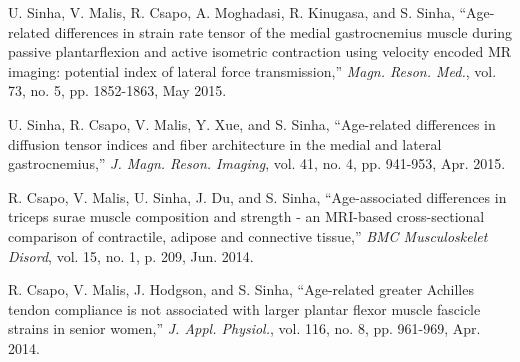\begin{frontmatter}
\begin{vitapage}
\begin{publications}
  \item U. Sinha, V. Malis, R. Csapo, A. Moghadasi, R. Kinugasa, and S. Sinha, ``Age-related differences in strain rate tensor of the medial gastrocnemius muscle during passive plantarflexion and active isometric contraction using velocity encoded MR imaging: potential index of lateral force transmission,'' \emph{Magn. Reson. Med.}, vol. 73, no. 5, pp. 1852-1863, May 2015.
  \item U. Sinha, R. Csapo, V. Malis, Y. Xue, and S. Sinha, ``Age-related differences in diffusion tensor indices and fiber architecture in the medial and lateral gastrocnemius,'' \emph{J. Magn. Reson. Imaging}, vol. 41, no. 4, pp. 941-953, Apr. 2015.
  \item R. Csapo, V. Malis, U. Sinha, J. Du, and S. Sinha, ``Age-associated differences in triceps surae muscle composition and strength - an MRI-based cross-sectional comparison of contractile, adipose and connective tissue,'' \emph{BMC Musculoskelet Disord}, vol. 15, no. 1, p. 209, Jun. 2014.
  \item R. Csapo, V. Malis, J. Hodgson, and S. Sinha, ``Age-related greater Achilles tendon compliance is not associated with larger plantar flexor muscle fascicle strains in senior women,'' \emph{J. Appl. Physiol.}, vol. 116, no. 8, pp. 961-969, Apr. 2014.
\end{publications}


\end{vitapage}
\end{frontmatter}
